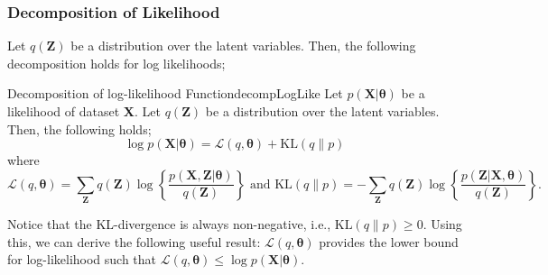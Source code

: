 \documentclass{article}
\begin{document}
        \subsubsection{Decomposition of Likelihood}
            Let $q(\textbf{Z})$ be a distribution over the latent variables. Then, the following decomposition holds for log likelihoods;
            \begin{thm}{Decomposition of log-likelihood Function}{decompLogLike}
                Let $p(\textbf{X}|\bm\theta)$ be a likelihood of dataset \textbf{X}. Let $q(\textbf{Z})$ be a distribution over the latent variables.
                Then, the following holds;
                \[
                \log{p(\textbf{X}|\bm\theta)}=\mathcal{L}(q,\bm\theta) + \text{KL}(q\|p)
                \]
                where
                \[
                \mathcal{L}(q,\bm\theta)=\sum_{\textbf{Z}}q(\textbf{Z})\log{\left\{ \frac{p(\textbf{X},\textbf{Z}|\bm\theta)}{q(\textbf{Z})} \right\}}
                \text{ and }
                \text{KL}(q\|p)=-\sum_{\textbf{Z}}q(\textbf{Z})\log{\left\{ \frac{p(\textbf{Z}|\textbf{X},\bm\theta)}{q(\textbf{Z})} \right\}}.
                \]
            \end{thm}

            Notice that the KL-divergence is always non-negative, i.e., $\text{KL}(q\|p) \geq 0$. Using this, we can derive the following useful result:
            $\mathcal{L}(q,\bm\theta)$ provides the lower bound for log-likelihood such that $\mathcal{L}(q,\bm\theta) \leq \log{p(\textbf{X}|\bm\theta)}$.
\end{document}
